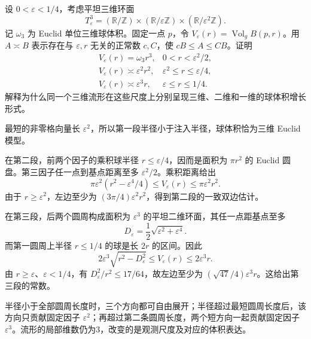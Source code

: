 \begin{exercise}\label{g3:ex:two-collapse-scales}
	设 \(0<\varepsilon<1/4\)，考虑平坦三维环面
	\[
		T_\varepsilon^3
		=(\mathbb R/\mathbb Z)\times(\mathbb R/\varepsilon\mathbb Z)
		\times(\mathbb R/\varepsilon^2\mathbb Z).
	\]
	记 \(\omega_3\) 为 Euclid 单位三维球体积。固定一点 \(p\)，令 \(V_\varepsilon(r)=\operatorname{Vol}_gB(p,r)\)。用 \(A\asymp B\) 表示存在与 \(\varepsilon,r\) 无关的正常数 \(c,C\)，使 \(cB\le A\le CB\)。证明
	\[
	\begin{array}{ll}
		V_\varepsilon(r)=\omega_3r^3,
		&0<r<\varepsilon^2/2,\\[2pt]
		V_\varepsilon(r)\asymp\varepsilon^2r^2,
		&\varepsilon^2\le r\le\varepsilon/4,\\[2pt]
		V_\varepsilon(r)\asymp\varepsilon^3r,
		&\varepsilon\le r\le1/4.
	\end{array}
	\]
	解释为什么同一个三维流形在这些尺度上分别呈现三维、二维和一维的球体积增长形式。
\end{exercise}
\begin{solution}
	最短的非零格向量长 \(\varepsilon^2\)，所以第一段半径小于注入半径，球体积恰为三维 Euclid 模型。

	在第二段，前两个因子的乘积球半径 \(r\le\varepsilon/4\)，因而是面积为 \(\pi r^2\) 的 Euclid 圆盘。第三因子任一点到基点距离至多 \(\varepsilon^2/2\)。乘积距离给出
	\[
		\pi\varepsilon^2(r^2-\varepsilon^4/4)
		\le V_\varepsilon(r)\le\pi\varepsilon^2r^2.
	\]
	由于 \(r\ge\varepsilon^2\)，左边至少为 \((3\pi/4)\varepsilon^2r^2\)，得到第二段的一致双边估计。

	在第三段，后两个圆周构成面积为 \(\varepsilon^3\) 的平坦二维环面，其任一点距基点至多
	\[
		D_\varepsilon=\frac12\sqrt{\varepsilon^2+\varepsilon^4}.
	\]
	而第一圆周上半径 \(r\le1/4\) 的球是长 \(2r\) 的区间。因此
	\[
		2\varepsilon^3\sqrt{r^2-D_\varepsilon^2}
		\le V_\varepsilon(r)\le2\varepsilon^3r.
	\]
	由 \(r\ge\varepsilon\)、\(\varepsilon<1/4\)，有 \(D_\varepsilon^2/r^2\le17/64\)，故左边至少为 \((\sqrt{47}/4)\varepsilon^3r\)。这给出第三段的常数。

	半径小于全部圆周长度时，三个方向都可自由展开；半径超过最短圆周长度后，该方向只贡献固定因子 \(\varepsilon^2\)；再超过第二条圆周长度，两个短方向一起贡献固定因子 \(\varepsilon^3\)。流形的局部维数仍为3，改变的是观测尺度及对应的体积表达。
\end{solution}

